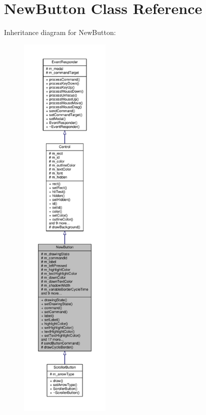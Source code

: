 \hypertarget{classNewButton}{}\section{New\+Button Class Reference}
\label{classNewButton}


Inheritance diagram for New\+Button\+:
\nopagebreak
\begin{figure}[H]
\begin{center}
\leavevmode
\includegraphics[height=550pt]{d8/dd1/classNewButton__inherit__graph}
\end{center}
\end{figure}


